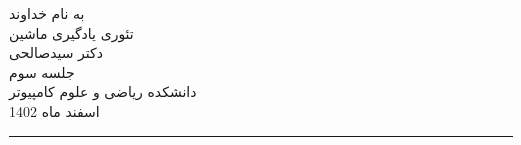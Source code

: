 \begin{minipage}{0.1\textwidth}

\end{minipage}%
\hfill%
\begin{minipage}{0.6\textwidth}\centering
\fontsize{10pt}{10pt}\selectfont
به نام خداوند \\
تئوری یادگیری ماشین \\
دکتر سیدصالحی\\
جلسه سوم
 \\
\vspace{0.25cm}
\begingroup
\fontsize{8pt}{8pt}\selectfont
دانشکده ریاضی و علوم کامپیوتر \\
اسفند ماه 1402\\
\endgroup
\end{minipage}%
\hfill%
\begin{minipage}{0.1\textwidth}
\end{minipage}

\vspace{0.5cm}

\noindent\rule{\textwidth}{1pt}